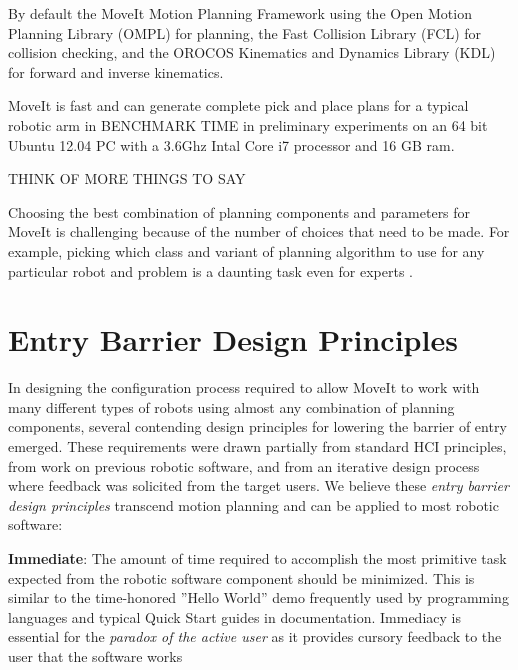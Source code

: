 \documentclass[10pt,journal,compsoc]{joser1}
\begin{document}
{By default the MoveIt Motion Planning Framework using the Open Motion Planning Library (OMPL) \cite{sucan2012the-open-motion-planning-library} for planning, the Fast Collision Library (FCL) \cite{fcl} for collision checking, and the OROCOS Kinematics and Dynamics Library (KDL) \cite{kdl} for forward and inverse kinematics. 

MoveIt is fast and can generate complete pick and place plans for a typical robotic arm in BENCHMARK TIME in preliminary experiments on an 64 bit Ubuntu 12.04 PC with a 3.6Ghz Intal Core i7 processor and 16 GB ram.

THINK OF MORE THINGS TO SAY

Choosing the best combination of planning components and parameters for MoveIt is challenging because of the number of choices that need to be made. For example, picking which class and variant of planning algorithm to use for any particular robot and problem is a daunting task even for experts \cite{cohen2012generic}.

\section{Entry Barrier Design Principles}
\label{sec::requirements}

In designing the configuration process required to allow MoveIt to work with many different types of robots using almost any combination of planning components, several contending design principles for lowering the barrier of entry emerged. These requirements were drawn partially from standard HCI principles, from work on previous robotic software, and from an iterative design process where feedback was solicited from the target users. We believe these \textit{entry barrier design principles} transcend motion planning and can be applied to most robotic software:

{\bf Immediate}: The amount of time required to accomplish the most primitive task expected from the robotic software component should be minimized. This is similar to the time-honored ''Hello World'' demo frequently used by programming languages and typical Quick Start guides in documentation. Immediacy is essential for the \textit{paradox of the active user} as it provides cursory feedback to the user that the software works

}
\end{document}
